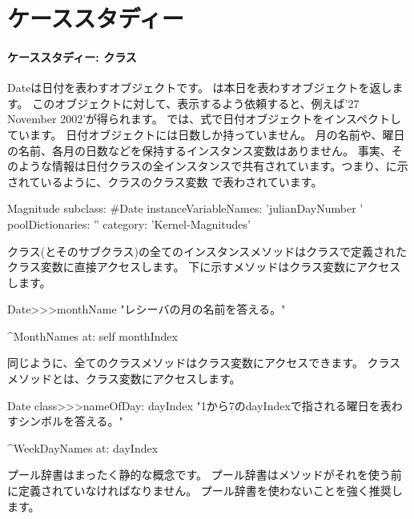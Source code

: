 \documentclass[a4paper,10pt,twoside]{book}
\begin{document}
	\renewcommand{\nnbb}[2]{} %
	\sloppy
\fi


\chapter{ケーススタディー}

\subsubsection{ケーススタディー: クラス}
Dateは日付を表わすオブジェクトです。
は本日を表わすオブジェクトを返します。
このオブジェクトに対して、表示するよう依頼すると、例えば'27 November 2002'が得られます。%
では、式で日付オブジェクトをインスペクトしています。
日付オブジェクトには日数しか持っていません。
月の名前や、曜日の名前、各月の日数などを保持するインスタンス変数はありません。
事実、そのような情報は日付クラスの全インスタンスで共有されています。つまり、に示されているように、クラスのクラス変数 %
で表わされています。

\begin{classdef}{}
Magnitude subclass: \#Date
   instanceVariableNames: 'julianDayNumber '
   poolDictionaries: ''
   category: 'Kernel-Magnitudes'
\end{classdef}


クラス(とそのサブクラス)の全てのインスタンスメソッドはクラスで定義されたクラス変数に直接アクセスします。
下に示すメソッドはクラス変数にアクセスします。

\begin{method}{}
Date>>>monthName
   "レシーバの月の名前を答える。"

   ^MonthNames at: self monthIndex
\end{method}

同じように、全てのクラスメソッドはクラス変数にアクセスできます。
クラスメソッドとは、クラス変数にアクセスします。

\begin{method}{}
Date class>>>nameOfDay: dayIndex 
   "1から7のdayIndexで指される曜日を表わすシンボルを答える。"

   ^WeekDayNames at: dayIndex
\end{method}


プール辞書はまったく静的な概念です。 %
プール辞書はメソッドがそれを使う前に定義されていなければなりません。%
プール辞書を使わないことを強く推奨します。%

\ifx\wholebook\relax\else
\end{document}
